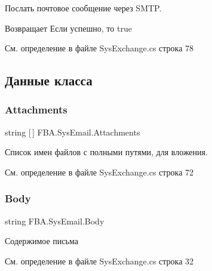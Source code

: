 Послать почтовое сообщение через S\+M\+TP. 

\begin{DoxyReturn}{Возвращает}
Если успешно, то true
\end{DoxyReturn}


См. определение в файле Sys\+Exchange.\+cs строка 78



\subsection{Данные класса}
\mbox{\label{class_f_b_a_1_1_sys_email_aa2240ff06fb06d45f579d870bb15e9be}} 
\subsubsection{\texorpdfstring{Attachments}{Attachments}}
{\footnotesize\ttfamily string \mbox{[}$\,$\mbox{]} F\+B\+A.\+Sys\+Email.\+Attachments}



Список имен файлов с полными путями, для вложения. 



См. определение в файле Sys\+Exchange.\+cs строка 72

\mbox{\label{class_f_b_a_1_1_sys_email_aa325838d1b75ea901f439449f6707df0}} 
\subsubsection{\texorpdfstring{Body}{Body}}
{\footnotesize\ttfamily string F\+B\+A.\+Sys\+Email.\+Body}



Содержимое письма 



См. определение в файле Sys\+Exchange.\+cs строка 32

\mbox{\label{class_f_b_a_1_1_sys_email_ad09bcb462dcdd51123896d6f7ae08a63}} 
